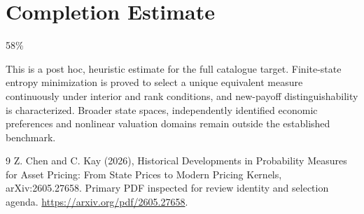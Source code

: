 \documentclass[11pt]{article}
\begin{document}
\section{Completion Estimate}
58\%

This is a post hoc, heuristic estimate for the full catalogue target.
Finite-state entropy minimization is proved to select a unique equivalent measure continuously under interior and rank conditions, and new-payoff distinguishability is characterized. Broader state spaces, independently identified economic preferences and nonlinear valuation domains remain outside the established benchmark.

\begin{thebibliography}{9}
 Z. Chen and C. Kay (2026), Historical Developments in Probability Measures for Asset Pricing: From State Prices to Modern Pricing Kernels, arXiv:2605.27658. Primary PDF inspected for review identity and selection agenda. \url{https://arxiv.org/pdf/2605.27658}.
\end{thebibliography}
\end{document}
